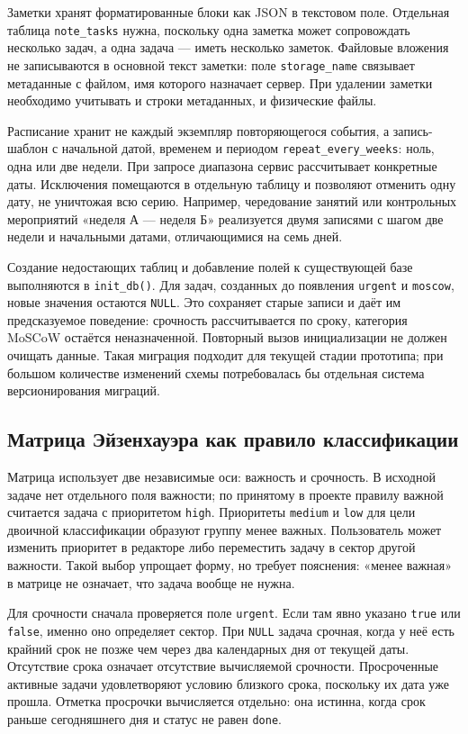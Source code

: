 \documentclass[14pt,a4paper]{extarticle}
\begin{document}
Заметки хранят форматированные блоки как JSON в текстовом поле. Отдельная таблица \texttt{note\_tasks} нужна, поскольку одна заметка может сопровождать несколько задач, а одна задача --- иметь несколько заметок. Файловые вложения не записываются в основной текст заметки: поле \texttt{storage\_name} связывает метаданные с файлом, имя которого назначает сервер. При удалении заметки необходимо учитывать и строки метаданных, и физические файлы.

Расписание хранит не каждый экземпляр повторяющегося события, а запись-шаблон с начальной датой, временем и периодом \texttt{repeat\_every\_weeks}: ноль, одна или две недели. При запросе диапазона сервис рассчитывает конкретные даты. Исключения помещаются в отдельную таблицу и позволяют отменить одну дату, не уничтожая всю серию. Например, чередование занятий или контрольных мероприятий «неделя А --- неделя Б» реализуется двумя записями с шагом две недели и начальными датами, отличающимися на семь дней.

Создание недостающих таблиц и добавление полей к существующей базе выполняются в \texttt{init\_db()}. Для задач, созданных до появления \texttt{urgent} и \texttt{moscow}, новые значения остаются \texttt{NULL}. Это сохраняет старые записи и даёт им предсказуемое поведение: срочность рассчитывается по сроку, категория MoSCoW остаётся неназначенной. Повторный вызов инициализации не должен очищать данные. Такая миграция подходит для текущей стадии прототипа; при большом количестве изменений схемы потребовалась бы отдельная система версионирования миграций.

\subsection{Матрица Эйзенхауэра как правило классификации}

Матрица использует две независимые оси: важность и срочность. В исходной задаче нет отдельного поля важности; по принятому в проекте правилу важной считается задача с приоритетом \texttt{high}. Приоритеты \texttt{medium} и \texttt{low} для цели двоичной классификации образуют группу менее важных. Пользователь может изменить приоритет в редакторе либо переместить задачу в сектор другой важности. Такой выбор упрощает форму, но требует пояснения: «менее важная» в матрице не означает, что задача вообще не нужна.

Для срочности сначала проверяется поле \texttt{urgent}. Если там явно указано \texttt{true} или \texttt{false}, именно оно определяет сектор. При \texttt{NULL} задача срочная, когда у неё есть крайний срок не позже чем через два календарных дня от текущей даты. Отсутствие срока означает отсутствие вычисляемой срочности. Просроченные активные задачи удовлетворяют условию близкого срока, поскольку их дата уже прошла. Отметка просрочки вычисляется отдельно: она истинна, когда срок раньше сегодняшнего дня и статус не равен \texttt{done}.
\end{document}
